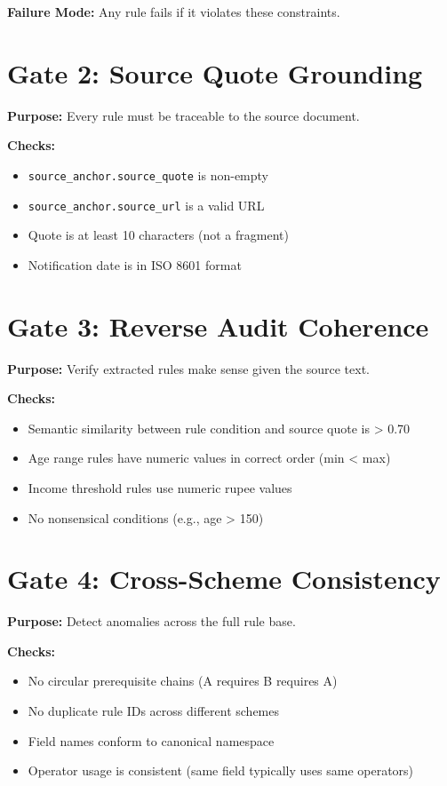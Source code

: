 \documentclass[11pt,a4paper]{report}
\newcommand{\inlinecode}[1]{\texttt{\color{secondary}#1}}
\begin{document}
\textbf{Failure Mode:} Any rule fails if it violates these constraints.

\section{Gate 2: Source Quote Grounding}

\textbf{Purpose:} Every rule must be traceable to the source document.

\textbf{Checks:}
\begin{itemize}
  \item \inlinecode{source\_anchor.source\_quote} is non-empty
  \item \inlinecode{source\_anchor.source\_url} is a valid URL
  \item Quote is at least 10 characters (not a fragment)
  \item Notification date is in ISO 8601 format
\end{itemize}

\section{Gate 3: Reverse Audit Coherence}

\textbf{Purpose:} Verify extracted rules make sense given the source text.

\textbf{Checks:}
\begin{itemize}
  \item Semantic similarity between rule condition and source quote is > 0.70
  \item Age range rules have numeric values in correct order (min < max)
  \item Income threshold rules use numeric rupee values
  \item No nonsensical conditions (e.g., age > 150)
\end{itemize}

\section{Gate 4: Cross-Scheme Consistency}

\textbf{Purpose:} Detect anomalies across the full rule base.

\textbf{Checks:}
\begin{itemize}
  \item No circular prerequisite chains (A requires B requires A)
  \item No duplicate rule IDs across different schemes
  \item Field names conform to canonical namespace
  \item Operator usage is consistent (same field typically uses same operators)
\end{itemize}
\end{document}
